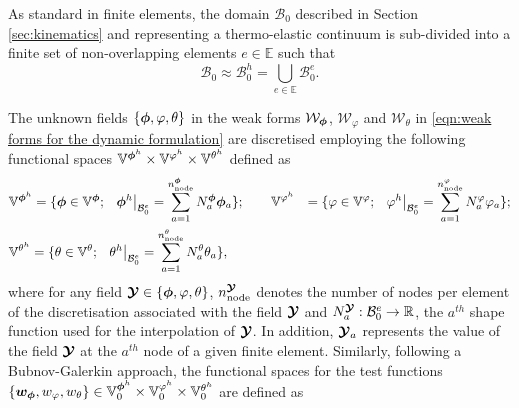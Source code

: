 As standard in finite elements, the domain $\mathcal{B}_0$ described in Section \ref{sec:kinematics} and representing a thermo-elastic continuum is sub-divided into a finite set of non-overlapping elements $e\in \mathbb{E}$ such that 
%
\begin{equation}
\mathcal{B}_0\approx \mathcal{B}_0^h = \bigcup_{e\in\mathbb{E}}   \mathcal{B}^e_{0}.
\end{equation}

The unknown fields $\{\boldsymbol{\phi},{\varphi},\theta\}$ in the weak forms $\mathcal{W}_{\boldsymbol{\phi}}$, $\mathcal{W}_{{\varphi}}$ and $\mathcal{W}_{{\theta}}$ in \eqref{eqn:weak forms for the dynamic formulation} are discretised employing the following functional spaces $\mathbb{V}^{\boldsymbol{\phi}^h}\times\mathbb{V}^{{\varphi}^h}\times\mathbb{V}^{{\theta}^h}$ defined as
%
\begin{equation}\label{eqn:functional spaces for discretisation}
\begin{aligned}
&	\begin{aligned}
\mathbb{V}^{\vect{\phi}^h}& = \{\vect{\phi}\in \mathbb{V}^{\vect{\phi}};\,\,\,\,
\left.\vect{\phi}^h\right\vert_{\mathcal{B}_0^e} = \sum_{a=1}^{n_{\text{node}}^{\vect{\phi}}}N^{\vect{\phi}}_a\vect{\phi}_a\};\qquad
%
%
\mathbb{V}^{{\varphi}^h}& = \{{\varphi}\in \mathbb{V}^{{\varphi}};\,\,\,\,
\left.{\varphi}^h\right\vert_{\mathcal{B}_0^e} = \sum_{a=1}^{n_{\text{node}}^{{\varphi}}}N^{{\varphi}}_a{\varphi}_a\};\\
%
\end{aligned}
\\
%
&\mathbb{V}^{\theta^h} = \{\theta\in \mathbb{V}^{\theta};\,\,\,\,\left.\theta^h\right\vert_{\mathcal{B}_0^e} = \sum_{a=1}^{n_{\text{node}}^{\theta}}N^{\theta}_a\theta_{a}\},
%
%
\end{aligned}
\end{equation}
%
where for any field $\boldsymbol{\mathcal{Y}}\in\{\boldsymbol{\phi},\varphi,\theta\}$, $n_{\text{node}}^{\boldsymbol{\mathcal{Y}}}$ denotes the number of nodes per element of the discretisation associated with the field $\boldsymbol{\mathcal{Y}}$ and $N^{\boldsymbol{\mathcal{Y}}}_{a}:\mathcal{B}_0^e\rightarrow \mathbb{R}$,  the $a^{th}$ shape function used for the interpolation of  $\boldsymbol{\mathcal{Y}}$. 
In addition, $\boldsymbol{\mathcal{Y}}_a$ represents the value of the field $\boldsymbol{\mathcal{Y}}$ at the $a^{th}$ node of a given finite element. 
Similarly, following a Bubnov-Galerkin approach, the functional spaces for the test functions $\{\boldsymbol{w}_{\boldsymbol{\phi}},w_{\varphi},w_{\theta}\}\in \mathbb{V}^{\boldsymbol{\phi}^h}_0\times \mathbb{V}^{{\varphi}^h}_0\times\mathbb{V}_0^{\theta^h}$ are defined as
